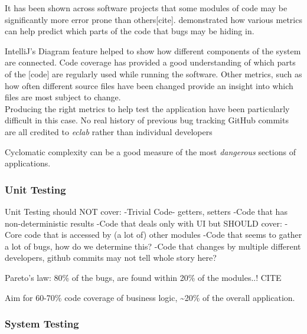 \documentclass[11pt]{article}
\begin{document}
It has been shown across software projects that some modules of code may be significantly more error prone than others[cite].
\cite{predicting_from_history} demonstrated how various metrics can help predict which parts of the code that bugs may be hiding in.


IntelliJ's Diagram feature helped to show how different components of the system are connected.
Code coverage has provided a good understanding of which parts of the [code] are regularly used while running the software.
Other metrics, such as how often different source files have been changed provide an insight into which files are most subject to change.
\\

Producing the right metrics to help test the application have been particularly difficult in this case.
No real history of previous bug tracking
GitHub commits are all credited to \textit{eclab} rather than individual developers


Cyclomatic complexity can be a good measure of the most \textit{dangerous} sections of applications.

\subsubsection{Unit Testing}
Unit Testing should NOT cover:
-Trivial Code- getters, setters
-Code that has non-deterministic results
-Code that deals only with UI
but SHOULD cover:
-Core code that is accessed by (a lot of) other modules
-Code that seems to gather a lot of bugs, how do we determine this?
-Code that changes by multiple different developers, github commits may not tell whole story here?
\cite{dont_test_blindly}

Pareto's law: 80\% of the bugs, are found within 20\% of the modules..! CITE

Aim for 60-70\% code coverage of business logic,
\textasciitilde 20\% of the overall application.


\subsubsection{System Testing}
\end{document}
